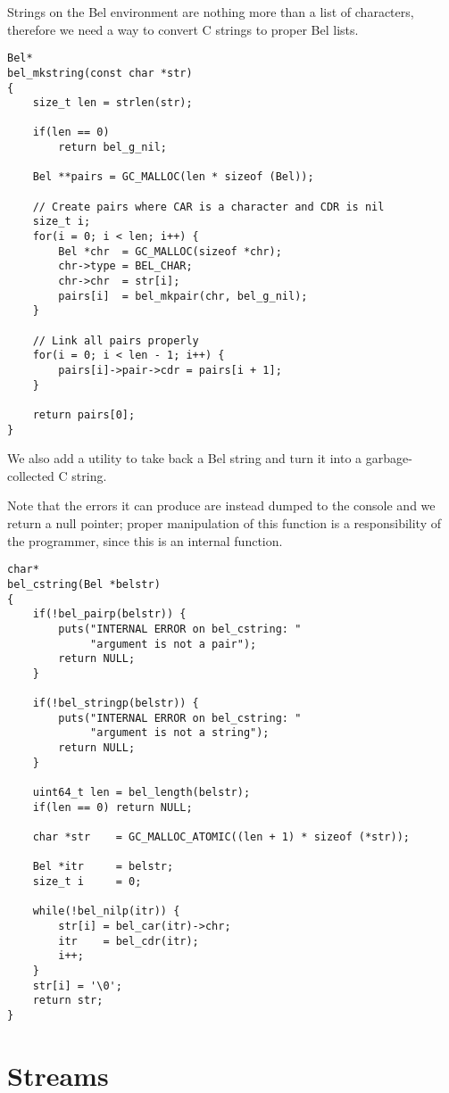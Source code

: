 \documentclass[openright,a4paper,twoside,12pt]{memoir}
\begin{document}
Strings on the Bel environment are nothing more than a list of
characters, therefore we need a way to convert C strings to proper Bel
lists.

\begin{verbatim}
Bel*
bel_mkstring(const char *str)
{
    size_t len = strlen(str);

    if(len == 0)
        return bel_g_nil;
    
    Bel **pairs = GC_MALLOC(len * sizeof (Bel));

    // Create pairs where CAR is a character and CDR is nil
    size_t i;
    for(i = 0; i < len; i++) {
        Bel *chr  = GC_MALLOC(sizeof *chr);
        chr->type = BEL_CHAR;
        chr->chr  = str[i];
        pairs[i]  = bel_mkpair(chr, bel_g_nil);
    }

    // Link all pairs properly
    for(i = 0; i < len - 1; i++) {
        pairs[i]->pair->cdr = pairs[i + 1];
    }

    return pairs[0];
}
\end{verbatim}

We also add a utility to take back a Bel string and turn it into a
garbage-collected C string.

Note that the errors it can produce are instead dumped to the console
and we return a null pointer; proper manipulation of this function is
a responsibility of the programmer, since this is an internal
function.

\begin{verbatim}
char*
bel_cstring(Bel *belstr)
{
    if(!bel_pairp(belstr)) {
        puts("INTERNAL ERROR on bel_cstring: "
             "argument is not a pair");
        return NULL;
    }
    
    if(!bel_stringp(belstr)) {
        puts("INTERNAL ERROR on bel_cstring: "
             "argument is not a string");
        return NULL;
    }
    
    uint64_t len = bel_length(belstr);
    if(len == 0) return NULL;
    
    char *str    = GC_MALLOC_ATOMIC((len + 1) * sizeof (*str));

    Bel *itr     = belstr;
    size_t i     = 0;

    while(!bel_nilp(itr)) {
        str[i] = bel_car(itr)->chr;
        itr    = bel_cdr(itr);
        i++;
    }
    str[i] = '\0';
    return str;
}
\end{verbatim}

\section{Streams}
\label{sec:org13b5c51}
\end{document}
